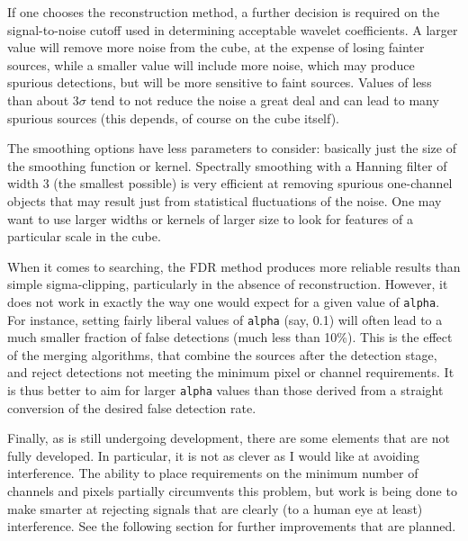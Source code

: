 If one chooses the reconstruction method, a further decision is
required on the signal-to-noise cutoff used in determining acceptable
wavelet coefficients. A larger value will remove more noise from the
cube, at the expense of losing fainter sources, while a smaller value
will include more noise, which may produce spurious detections, but
will be more sensitive to faint sources. Values of less than about
$3\sigma$ tend to not reduce the noise a great deal and can lead to
many spurious sources (this depends, of course on the cube itself).

The smoothing options have less parameters to consider: basically just
the size of the smoothing function or kernel. Spectrally smoothing
with a Hanning filter of width 3 (the smallest possible) is very
efficient at removing spurious one-channel objects that may result
just from statistical fluctuations of the noise. One may want to use
larger widths or kernels of larger size to look for features of a
particular scale in the cube.

When it comes to searching, the FDR method produces more reliable
results than simple sigma-clipping, particularly in the absence of
reconstruction.  However, it does not work in exactly the way one
would expect for a given value of \texttt{alpha}. For instance,
setting fairly liberal values of \texttt{alpha} (say, 0.1) will often
lead to a much smaller fraction of false detections (\ie much less
than 10\%). This is the effect of the merging algorithms, that combine
the sources after the detection stage, and reject detections not
meeting the minimum pixel or channel requirements.  It is thus better
to aim for larger \texttt{alpha} values than those derived from a
straight conversion of the desired false detection rate.

Finally, as \duchamp is still undergoing development, there are some
elements that are not fully developed. In particular, it is not as
clever as I would like at avoiding interference. The ability to place
requirements on the minimum number of channels and pixels partially
circumvents this problem, but work is being done to make \duchamp
smarter at rejecting signals that are clearly (to a human eye at
least) interference. See the following section for further
improvements that are planned.
